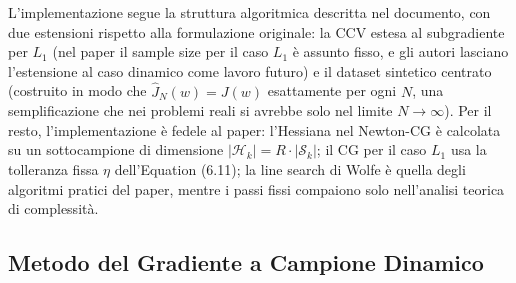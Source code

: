 \documentclass[a4paper,12pt]{article}
\begin{document}
L'implementazione segue la struttura algoritmica descritta nel documento, con due estensioni rispetto alla formulazione originale: la CCV estesa al subgradiente per $L_1$ (nel paper il sample size per il caso $L_1$ è assunto fisso, e gli autori lasciano l'estensione al caso dinamico come lavoro futuro) e il dataset sintetico centrato (costruito in modo che $\hat J_N(w) = J(w)$ esattamente per ogni $N$, una semplificazione che nei problemi reali si avrebbe solo nel limite $N \to \infty$). Per il resto, l'implementazione è fedele al paper: l'Hessiana nel Newton-CG è calcolata su un sottocampione di dimensione $|\mathcal{H}_k| = R \cdot |\mathcal{S}_k|$; il CG per il caso $L_1$ usa la tolleranza fissa $\eta$ dell'Equation (6.11); la line search di Wolfe è quella degli algoritmi pratici del paper, mentre i passi fissi compaiono solo nell'analisi teorica di complessità.
\newpage
\subsection{Metodo del Gradiente a Campione Dinamico}
\end{document}

